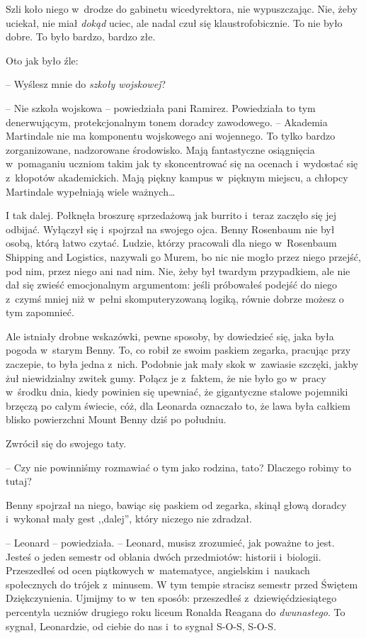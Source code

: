 \documentclass[oneside,polish,11pt,rmheadings]{mwbk}
\begin{document}
Szli koło niego w~drodze do gabinetu wicedyrektora, nie wypuszczając. Nie, żeby uciekał, nie miał \textit{dokąd }uciec, ale nadal czuł się klaustrofobicznie. To nie było dobre. To było bardzo, bardzo złe. 


Oto jak było źle: 

-- Wyślesz mnie do \textit{szkoły wojskowej}? 


-- Nie szkoła wojskowa -- powiedziała pani Ramirez. Powiedziała to tym denerwującym, protekcjonalnym tonem doradcy zawodowego. -- Akademia Martindale nie ma komponentu wojskowego ani wojennego. To tylko bardzo zorganizowane, nadzorowane środowisko. Mają fantastyczne osiągnięcia w~pomaganiu uczniom takim jak ty skoncentrować się na ocenach i~wydostać się z~kłopotów akademickich. Mają piękny kampus w~pięknym miejscu, a chłopcy Martindale wypełniają wiele ważnych\ldots  


I tak dalej. Połknęła broszurę sprzedażową jak burrito i~teraz zaczęło się jej odbijać. Wyłączył się i~spojrzał na swojego ojca. Benny Rosenbaum nie był osobą, którą łatwo czytać. Ludzie, którzy pracowali dla niego w~Rosenbaum Shipping and Logistics, nazywali go Murem, bo nic nie mogło przez niego przejść, pod nim, przez niego ani nad nim. Nie, żeby był twardym przypadkiem, ale nie dał się zwieść emocjonalnym argumentom: jeśli próbowałeś podejść do niego z~czymś mniej niż w~pełni skomputeryzowaną logiką, równie dobrze możesz o tym zapomnieć. 


Ale istniały drobne wskazówki, pewne sposoby, by dowiedzieć się, jaka była pogoda w~starym Benny. To, co robił ze swoim paskiem zegarka, pracując przy zaczepie, to była jedna z~nich. Podobnie jak mały skok w~zawiasie szczęki, jakby żuł niewidzialny zwitek gumy. Połącz je z~faktem, że nie było go w~pracy w~środku dnia, kiedy powinien się upewniać, że gigantyczne stalowe pojemniki brzęczą po całym świecie, cóż, dla Leonarda oznaczało to, że lawa była całkiem blisko powierzchni Mount Benny dziś po południu. 


Zwrócił się do swojego taty. 

-- Czy nie powinniśmy rozmawiać o tym jako rodzina, tato? Dlaczego robimy to tutaj? 


Benny spojrzał na niego, bawiąc się paskiem od zegarka, skinął głową doradcy i~wykonał mały gest ,,dalej'', który niczego nie zdradzał. 


-- Leonard -- powiedziała. -- Leonard, musisz zrozumieć, jak poważne to jest. Jesteś o jeden semestr od oblania dwóch przedmiotów: historii i~biologii. Przeszedłeś od ocen piątkowych w~matematyce, angielskim i~naukach społecznych do trójek z~minusem. W tym tempie stracisz semestr przed Świętem Dziękczynienia. Ujmijmy to w~ten sposób: przeszedłeś z~dziewięćdziesiątego percentyla uczniów drugiego roku liceum Ronalda Reagana do \textit{dwunastego}. To sygnał, Leonardzie, od ciebie do nas i~to sygnał S-O-S, S-O-S. 
\end{document}
